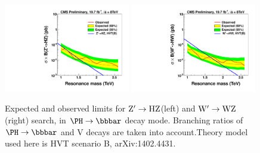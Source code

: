 \begin{figure}[ht!pb]
\begin{center}
\includegraphics[width=0.49\textwidth]{brazilianFlag_HbbZqqHPLP.pdf}
\includegraphics[width=0.49\textwidth]{brazilianFlag_HbbWqqHPLP.pdf}
\end{center}
\caption{Expected and observed limits for ${\rm Z'\to HZ}$(left) and ${\rm W' \to WZ}$(right)
 search, in $\Hbb$ decay mode. Branching ratios of $\Hbb$ and V decays are
 taken into account.Theory model used here is HVT scenario B, arXiv:1402.4431.
}
\label{fig:HbbVCombined}
\end{figure}



\clearpage
